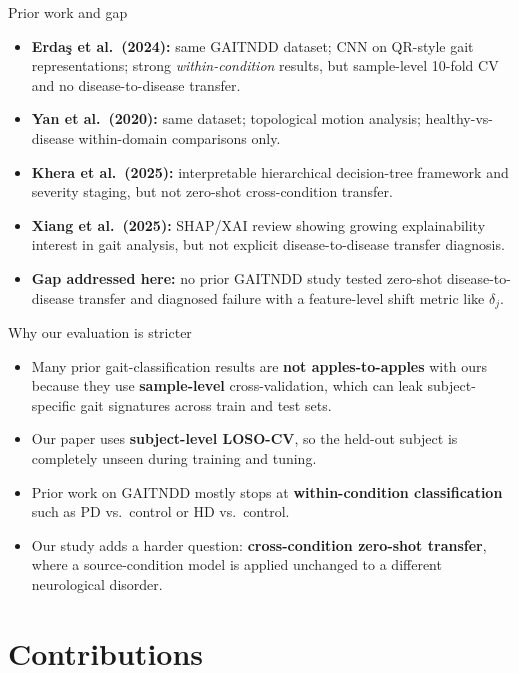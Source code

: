 \documentclass[aspectratio=43,10pt]{beamer}
\begin{document}
\begin{frame}{Prior work and gap}
  \begin{itemize}
    \item \textbf{Erda\c{s} et al.\ (2024):} same GAITNDD dataset; CNN on QR-style gait representations; strong \emph{within-condition} results, but sample-level 10-fold CV and no disease-to-disease transfer.
    \item \textbf{Yan et al.\ (2020):} same dataset; topological motion analysis; healthy-vs-disease within-domain comparisons only.
    \item \textbf{Khera et al.\ (2025):} interpretable hierarchical decision-tree framework and severity staging, but not zero-shot cross-condition transfer.
    \item \textbf{Xiang et al.\ (2025):} SHAP/XAI review showing growing explainability interest in gait analysis, but not explicit disease-to-disease transfer diagnosis.
    \item \textbf{Gap addressed here:} no prior GAITNDD study tested zero-shot disease-to-disease transfer and diagnosed failure with a feature-level shift metric like \(\delta_j\).
  \end{itemize}
\end{frame}

\begin{frame}{Why our evaluation is stricter}
  \begin{itemize}
    \item Many prior gait-classification results are \textbf{not apples-to-apples} with ours because they use \textbf{sample-level} cross-validation, which can leak subject-specific gait signatures across train and test sets.
    \item Our paper uses \textbf{subject-level LOSO-CV}, so the held-out subject is completely unseen during training and tuning.
    \item Prior work on GAITNDD mostly stops at \textbf{within-condition classification} such as PD vs.\ control or HD vs.\ control.
    \item Our study adds a harder question: \textbf{cross-condition zero-shot transfer}, where a source-condition model is applied unchanged to a different neurological disorder.
  \end{itemize}
\end{frame}

\section{Contributions}
\end{document}
